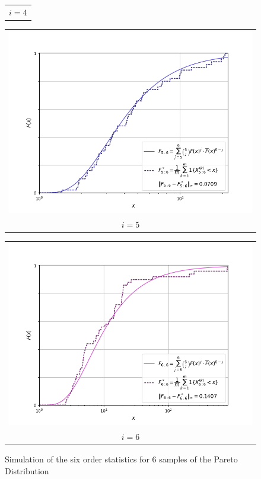 \begin{figure}[H]
\begin{tabular}{@{}c@{}}
        $i = 4$
    \end{tabular}
    \begin{tabular}{@{}c@{}}
        \includegraphics[trim={1.1cm 0.5cm 1.5cm 0cm}, clip,width=.46\linewidth]{../simulation/pareto_order_5:6.png} \\
        $i = 5$
      \end{tabular}
    \begin{tabular}{@{}c@{}}
        \includegraphics[trim={1.1cm 0.5cm 1.5cm 0cm}, clip,width=.46\linewidth]{../simulation/pareto_order_6:6.png} \\
        $i = 6$
    \end{tabular}
    \caption{Simulation of the six order statistics for 6 samples of the Pareto Distribution}
\end{figure}